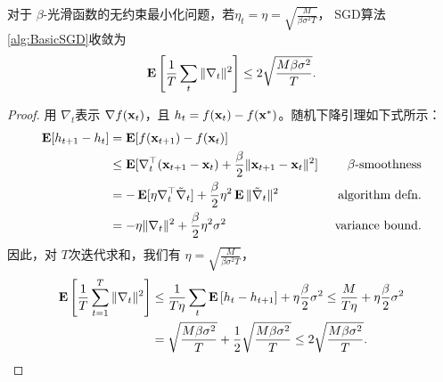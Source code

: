 \begin{theorem} \label{thm:non-convex-sgd}
对于 $\beta$-光滑函数的无约束最小化问题，若$\eta_t = \eta =  \sqrt{\frac{M}{ \beta \sigma^2 T}}$， SGD算法\ref{alg:BasicSGD}收敛为
$$ \mathop{\mbox{\bf E}} \left[  \frac{1}{T} \sum_t \| \nabla_t  \|^2 \right]  \leq  2 \sqrt{\frac{M \beta \sigma^2 }{T} }.$$
\end{theorem}
\begin{proof}
用 $\nabla_t$表示 $\nabla f(\mathbf x_t)$，且 $h_t = f(\mathbf x_t) - f(\mathbf x^*)$。随机下降引理如下式所示：
\begin{align*}
\mathop{\mbox{\bf E}}[ h_{t+1} - h_t ] & =  \mathop{\mbox{\bf E}} [ f(\mathbf x_{t+1})  - f(\mathbf x_t) ] \\
& \le  \mathop{\mbox{\bf E}}[  \nabla_t^\top (\mathbf x_{t+1} - \mathbf x_t) + \frac{\beta}{2} \|\mathbf x_{t+1} - \mathbf x_t\|^2 ]  & \text{ $\beta$-smoothness} \\
& =  - \mathop{\mbox{\bf E}}[  \eta \nabla _t^\top  \tilde{\nabla}_t]  + \frac{\beta}{2} \eta^2\mathop{\mbox{\bf E}}   \|\tilde{\nabla}_t\|^2 & \text{ algorithm defn.} \\
& =  - \eta \|{\nabla}_t \|^2  + \frac{\beta}{2} \eta^2 \sigma^2  & \text{ variance bound.} 
\end{align*}
因此，对 $T$次迭代求和，我们有 $\eta = \sqrt{\frac{M}{ \beta \sigma^2 T}}$，
\begin{eqnarray*}
\mathop{\mbox{\bf E}} \left[ \frac{1}{T} \sum_{t=1}^T \|\nabla_t \|^2 \right] & \leq \frac{1}{T \eta} \sum_t \mathop{\mbox{\bf E}} \left[ h_t - h_{t+1} \right] + \eta   \frac{\beta}{2}  \sigma^2  \leq  \frac{M}{T \eta}  + \eta   \frac{\beta}{2}  \sigma^2 \\
& = \sqrt{\frac{M \beta \sigma^2}{T}} + \frac{1}{2}  \sqrt{ \frac{M  \beta \sigma^2}{T}}  \leq 2 \sqrt{\frac{M \beta \sigma^2 }{ T}}  .
\end{eqnarray*}
\end{proof}





